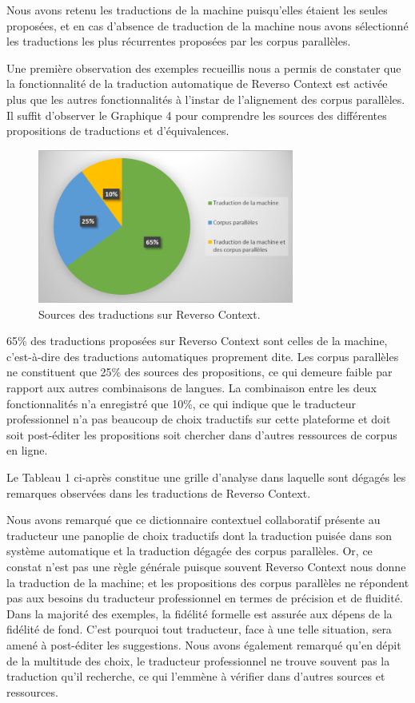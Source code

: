 \documentclass[french]{textolivre}
\begin{document}
Nous avons retenu les traductions de la machine puisqu’elles étaient les seules proposées, et en cas d’absence de traduction de la machine nous avons sélectionné les traductions les plus récurrentes proposées par les corpus parallèles.

Une première observation des exemples recueillis nous a permis de constater que la fonctionnalité de la traduction automatique de Reverso Context est activée plus que les autres fonctionnalités à l’instar de l’alignement des corpus parallèles. Il suffit d’observer le Graphique 4 pour comprendre les sources des différentes propositions de traductions et d’équivalences.

\begin{figure}[htbp]
 \centering
 \includegraphics[width=0.75\textwidth]{figure09.pdf}
 \caption{Sources des traductions sur Reverso Context.}
 \label{fig-09}
\end{figure}

65\% des traductions proposées sur Reverso Context sont celles de la machine, c’est-à-dire des traductions automatiques proprement dite. Les corpus parallèles ne constituent que 25\% des sources des propositions, ce qui demeure faible par rapport aux autres combinaisons de langues. La combinaison entre les deux fonctionnalités n’a enregistré que 10\%, ce qui indique que le traducteur professionnel n’a pas beaucoup de choix traductifs sur cette plateforme et doit soit post-éditer les propositions soit chercher dans d’autres ressources de corpus en ligne.

Le Tableau 1 ci-après constitue une grille d’analyse dans laquelle sont dégagés les remarques observées dans les traductions de Reverso Context.



Nous avons remarqué que ce dictionnaire contextuel collaboratif présente au traducteur une panoplie de choix traductifs dont la traduction puisée dans son système automatique et la traduction dégagée des corpus parallèles. Or, ce constat n’est pas une règle générale puisque souvent Reverso Context nous donne la traduction de la machine; et les propositions des corpus parallèles ne répondent pas aux besoins du traducteur professionnel en termes de précision et de fluidité.  Dans la majorité des exemples, la fidélité formelle est assurée aux dépens de la fidélité de fond. C’est pourquoi tout traducteur, face à une telle situation, sera amené à post-éditer les suggestions. Nous avons également remarqué qu’en dépit de la multitude des choix, le traducteur professionnel ne trouve souvent pas la traduction qu’il recherche, ce qui l’emmène à vérifier dans d’autres sources et ressources.
\end{document}

